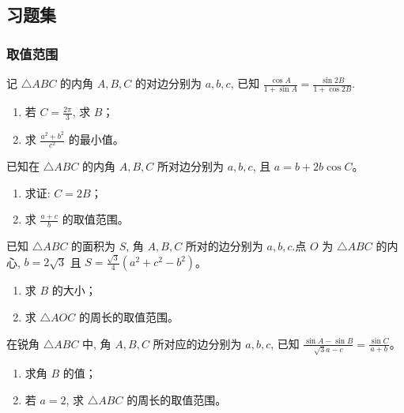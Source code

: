 \startexercise

\subsection*{习题集}

\subsubsection*{取值范围}

\begin{exercise}[2022 年全国新高考 I 卷第 18 题]
	记 $\triangle ABC$ 的内角 $A,B,C$ 的对边分别为 $a,b,c$, 已知 $\frac{\cos A}{1+\sin A} = \frac{\sin 2B}{1+\cos 2B}$.
	\begin{enumerate}
		\item[(1)] 若 $C = \frac{2\pi}{3}$, 求 $B$；
		\item[(2)] 求 $\frac{a^2+b^2}{c^2}$ 的最小值。
	\end{enumerate}
\end{exercise}

\begin{exercise}[2023 年衡水中学第三次综合素养评价第 18 题]
	已知在 $\triangle ABC$ 的内角 $A,B,C$ 所对边分别为 $a,b,c$, 且 $a=b+2b\cos C$。
	\begin{enumerate}
		\item[(1)] 求证: $C=2B$；
		\item[(2)] 求 $\frac{a+c}{b}$ 的取值范围。
	\end{enumerate}
\end{exercise}

\begin{exercise}
	已知 $\triangle ABC$ 的面积为 $S$, 角 $A,B,C$ 所对的边分别为 $a,b,c$.点 $O$ 为 $\triangle ABC$ 的内心, $b = 2\sqrt{3}$ 且 $S = \frac{\sqrt{3}}{4}(a^2+c^2-b^2)$。
	\begin{enumerate}
		\item[(1)] 求 $B$ 的大小；
		\item[(2)] 求 $\triangle AOC$ 的周长的取值范围。
	\end{enumerate}
\end{exercise}

\begin{exercise}
	在锐角 $\triangle ABC$ 中, 角 $A, B, C$ 所对应的边分别为 $a, b, c$, 已知 $\frac{\sin A - \sin B}{\sqrt{3}a - c} = \frac{\sin C}{a+b}$。
	\begin{enumerate}
		\item[(1)] 求角 $B$ 的值；
		\item[(2)] 若 $a=2$, 求 $\triangle ABC$ 的周长的取值范围。
	\end{enumerate}
\end{exercise}

